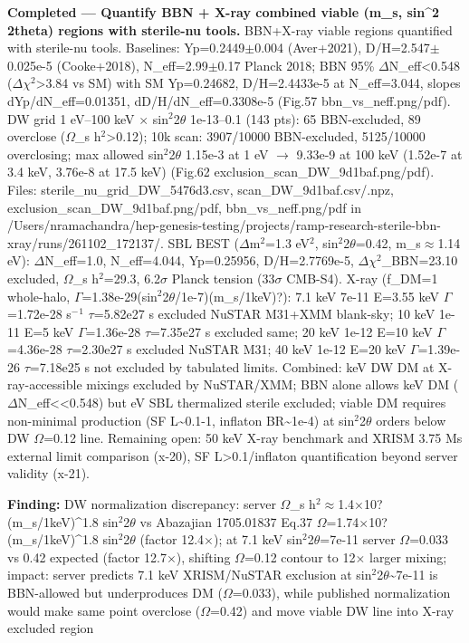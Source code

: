 \documentclass[11pt,a4paper]{article}
\begin{document}
\textbf{Completed --- Quantify BBN + X-ray combined viable (m\_s, sin\textasciicircum{}2 2theta) regions with sterile-nu tools.} BBN+X-ray viable regions quantified with sterile-nu tools. Baselines: Yp=0.2449$\pm$0.004 (Aver+2021), D/H=2.547$\pm$0.025e-5 (Cooke+2018), N\_eff=2.99$\pm$0.17 Planck 2018; BBN 95\% $\Delta$N\_eff\textless{}0.548 ($\Delta$$\chi$$^2$\textgreater{}3.84 vs SM) with SM Yp=0.24682, D/H=2.4433e-5 at N\_eff=3.044, slopes dYp/dN\_eff=0.01351, dD/H/dN\_eff=0.3308e-5 (Fig.57 bbn\_vs\_neff.png/pdf). DW grid 1 eV--100 keV $\times$ sin$^2$2$\theta$ 1e-13--0.1 (143 pts): 65 BBN-excluded, 89 overclose ($\Omega$\_s h$^2$\textgreater{}0.12); 10k scan: 3907/10000 BBN-excluded, 5125/10000 overclosing; max allowed sin$^2$2$\theta$ 1.15e-3 at 1 eV $\to$ 9.33e-9 at 100 keV (1.52e-7 at 3.4 keV, 3.76e-8 at 17.5 keV) (Fig.62 exclusion\_scan\_DW\_9d1baf.png/pdf). Files: sterile\_nu\_grid\_DW\_5476d3.csv, scan\_DW\_9d1baf.csv/.npz, exclusion\_scan\_DW\_9d1baf.png/pdf, bbn\_vs\_neff.png/pdf in /Users/nramachandra/hep-genesis-testing/projects/ramp-research-sterile-bbn-xray/runs/261102\_172137/. SBL BEST ($\Delta$m$^2$=1.3 eV$^2$, sin$^2$2$\theta$=0.42, m\_s$\approx$1.14 eV): $\Delta$N\_eff=1.0, N\_eff=4.044, Yp=0.25956, D/H=2.7769e-5, $\Delta$$\chi$$^2$\_BBN=23.10 excluded, $\Omega$\_s h$^2$=29.3, 6.2$\sigma$ Planck tension (33$\sigma$ CMB-S4). X-ray (f\_DM=1 whole-halo, $\Gamma$=1.38e-29(sin$^2$2$\theta$/1e-7)(m\_s/1keV)?): 7.1 keV 7e-11 E=3.55 keV $\Gamma$=1.72e-28 s$^-$$^1$ $\tau$=5.82e27 s excluded NuSTAR M31+XMM blank-sky; 10 keV 1e-11 E=5 keV $\Gamma$=1.36e-28 $\tau$=7.35e27 s excluded same; 20 keV 1e-12 E=10 keV $\Gamma$=4.36e-28 $\tau$=2.30e27 s excluded NuSTAR M31; 40 keV 1e-12 E=20 keV $\Gamma$=1.39e-26 $\tau$=7.18e25 s not excluded by tabulated limits. Combined: keV DW DM at X-ray-accessible mixings excluded by NuSTAR/XMM; BBN alone allows keV DM ($\Delta$N\_eff\textless{}\textless{}0.548) but eV SBL thermalized sterile excluded; viable DM requires non-minimal production (SF L\textasciitilde{}0.1-1, inflaton BR\textasciitilde{}1e-4) at sin$^2$2$\theta$ orders below DW $\Omega$=0.12 line. Remaining open: 50 keV X-ray benchmark and XRISM 3.75 Ms external limit comparison (x-20), SF L\textgreater{}0.1/inflaton quantification beyond server validity (x-21).

\textbf{Finding:} DW normalization discrepancy: server $\Omega$\_s h$^2$$\approx$1.4$\times$10?(m\_s/1keV)\textasciicircum{}1.8 sin$^2$2$\theta$ vs Abazajian 1705.01837 Eq.37 $\Omega$=1.74$\times$10?(m\_s/1keV)\textasciicircum{}1.8 sin$^2$2$\theta$ (factor 12.4$\times$); at 7.1 keV sin$^2$2$\theta$=7e-11 server $\Omega$=0.033 vs 0.42 expected (factor 12.7$\times$), shifting $\Omega$=0.12 contour to 12$\times$ larger mixing; impact: server predicts 7.1 keV XRISM/NuSTAR exclusion at sin$^2$2$\theta$\textasciitilde{}7e-11 is BBN-allowed but underproduces DM ($\Omega$=0.033), while published normalization would make same point overclose ($\Omega$=0.42) and move viable DW line into X-ray excluded region
\end{document}
